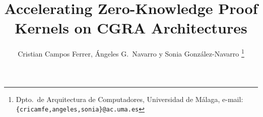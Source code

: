 \documentclass[twocolumn,twoside]{Jornadas}
\newcommand{\castm}{CASTM}
\newcommand{\pct}[1]{#1\%}
\newcommand{\timex}[1]{#1$\times$}
\begin{document}
\title{Accelerating Zero-Knowledge Proof Kernels on CGRA Architectures}

\author{%
     Cristian Campos Ferrer, Ángeles G.\ Navarro y Sonia González-Navarro%
     \thanks{Dpto.\ de Arquitectura de Computadores, Universidad de Málaga,
     e-mail: {\tt \{cricamfe,angeles,sonia\}@ac.uma.es}}
}

\maketitle
\markboth{}{}
\pagestyle{empty}
\thispagestyle{empty}

\end{document}
